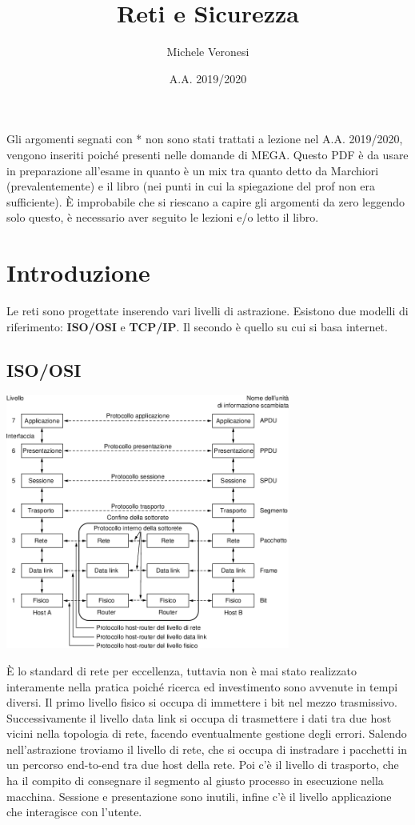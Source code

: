 \documentclass[10pt,a4paper,twoside]{article}
\author{Michele Veronesi}
\date{A.A. 2019/2020}
\title{Reti e Sicurezza}
\begin{document}
\maketitle
\tableofcontents
Gli argomenti segnati con * non sono stati trattati a lezione nel A.A. 2019/2020, vengono inseriti poiché presenti nelle domande di MEGA.
\newpage
Questo PDF è da usare in preparazione all'esame in quanto è un mix tra quanto detto da Marchiori (prevalentemente) e il libro (nei punti in cui la spiegazione del prof non era sufficiente). È improbabile che si riescano a capire gli argomenti da zero leggendo solo questo, è necessario aver seguito le lezioni e/o letto il libro.
\section*{Introduzione}
Le reti sono progettate inserendo vari livelli di astrazione. Esistono due modelli di riferimento: \textbf{ISO/OSI} e \textbf{TCP/IP}. Il secondo è quello su cui si basa internet.

\subsection*{ISO/OSI}
\begin{center}
\includegraphics[width=0.7\textwidth]{images/iso_osi.png}
\end{center}
È lo standard di rete per eccellenza, tuttavia non è mai stato realizzato interamente nella pratica poiché ricerca ed investimento sono avvenute in tempi diversi. Il primo livello fisico si occupa di immettere i bit nel mezzo trasmissivo. Successivamente il livello data link si occupa di trasmettere i dati tra due host vicini nella topologia di rete, facendo eventualmente gestione degli errori. Salendo nell'astrazione troviamo il livello di rete, che si occupa di instradare i pacchetti in un percorso end-to-end tra due host della rete. Poi c'è il livello di trasporto, che ha il compito di consegnare il segmento al giusto processo in esecuzione nella macchina. Sessione e presentazione sono inutili, infine c'è il livello applicazione che interagisce con l'utente.
\end{document}
